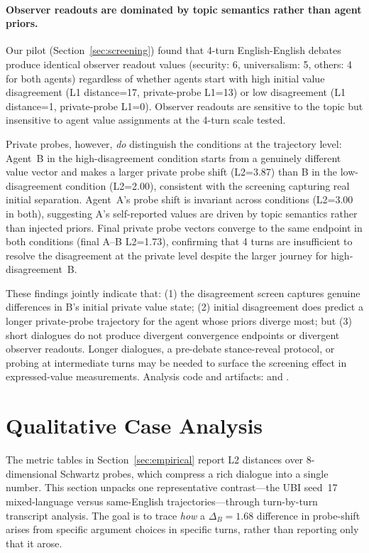 \documentclass{article}
\begin{document}
\paragraph{Observer readouts are dominated by topic semantics rather than agent priors.}
Our pilot (Section~\ref{sec:screening}) found that 4-turn English-English debates produce identical observer readout values (security: 6, universalism: 5, others: 4 for both agents) regardless of whether agents start with high initial value disagreement (L1 distance=17, private-probe L1=13) or low disagreement (L1 distance=1, private-probe L1=0). Observer readouts are sensitive to the topic but insensitive to agent value assignments at the 4-turn scale tested.

Private probes, however, \emph{do} distinguish the conditions at the trajectory level: Agent~B in the high-disagreement condition starts from a genuinely different value vector and makes a larger private probe shift (L2=3.87) than B in the low-disagreement condition (L2=2.00), consistent with the screening capturing real initial separation. Agent~A's probe shift is invariant across conditions (L2=3.00 in both), suggesting A's self-reported values are driven by topic semantics rather than injected priors. Final private probe vectors converge to the same endpoint in both conditions (final A--B L2=1.73), confirming that 4 turns are insufficient to resolve the disagreement at the private level despite the larger journey for high-disagreement~B.

These findings jointly indicate that: (1) the disagreement screen captures genuine differences in B's initial private value state; (2) initial disagreement does predict a longer private-probe trajectory for the agent whose priors diverge most; but (3) short dialogues do not produce divergent convergence endpoints or divergent observer readouts. Longer dialogues, a pre-debate stance-reveal protocol, or probing at intermediate turns may be needed to surface the screening effect in expressed-value measurements. Analysis code and artifacts:  and .

\section{Qualitative Case Analysis}
\label{sec:qualitative}

The metric tables in Section~\ref{sec:empirical} report L2 distances over 8-dimensional Schwartz probes, which compress a rich dialogue into a single number. This section unpacks one representative contrast---the UBI seed~17 mixed-language versus same-English trajectories---through turn-by-turn transcript analysis. The goal is to trace \emph{how} a $\Delta_B=1.68$ difference in probe-shift arises from specific argument choices in specific turns, rather than reporting only that it arose.
\end{document}
